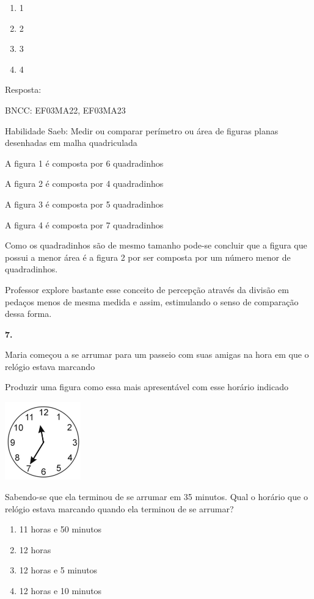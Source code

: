 \begin{enumerate}
\def\labelenumi{\alph{enumi})}
\item
  1
\item
  2
\item
  3
\item
  4
\end{enumerate}

Resposta:

BNCC: EF03MA22, EF03MA23

Habilidade Saeb: Medir ou comparar perímetro ou área de figuras planas
desenhadas em malha quadriculada

A figura 1 é composta por 6 quadradinhos

A figura 2 é composta por 4 quadradinhos

A figura 3 é composta por 5 quadradinhos

A figura 4 é composta por 7 quadradinhos

Como os quadradinhos são de mesmo tamanho pode-se concluir que a figura
que possui a menor área é a figura 2 por ser composta por um número
menor de quadradinhos.

Professor explore bastante esse conceito de percepção através da divisão
em pedaços menos de mesma medida e assim, estimulando o senso de
comparação dessa forma.

\textbf{7.}

Maria começou a se arrumar para um passeio com suas amigas na hora em
que o relógio estava marcando

Produzir uma figura como essa mais apresentável com esse horário
indicado

\includegraphics[width=1.29487in,height=1.32633in]{media/image134.png}

Sabendo-se que ela terminou de se arrumar em 35 minutos. Qual o horário
que o relógio estava marcando quando ela terminou de se arrumar?

\begin{enumerate}
\def\labelenumi{\alph{enumi})}
\item
  11 horas e 50 minutos
\item
  12 horas
\item
  12 horas e 5 minutos
\item
  12 horas e 10 minutos
\end{enumerate}

